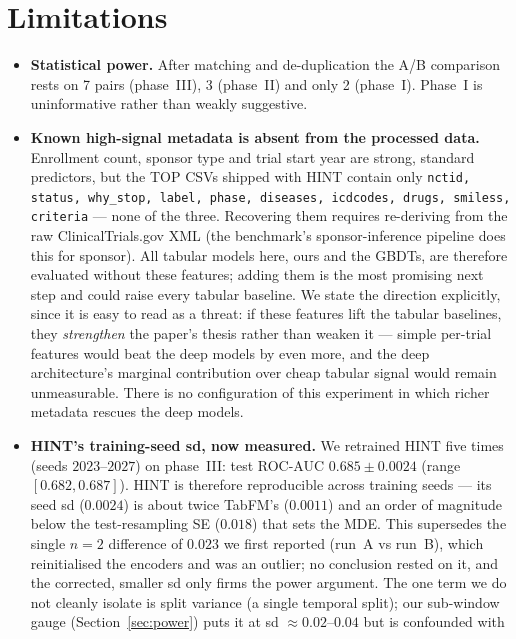 \documentclass[a4paper,fleqn]{cas-sc}
\begin{document}
\section{Limitations}
\begin{itemize}\itemsep2pt
  \item \textbf{Statistical power.} After matching and de-duplication the A/B comparison
        rests on 7 pairs (phase~III), 3 (phase~II) and only 2 (phase~I). Phase~I is
        uninformative rather than weakly suggestive.
  \item \textbf{Known high-signal metadata is absent from the processed data.} Enrollment
        count, sponsor type and trial start year are strong, standard predictors, but the TOP
        CSVs shipped with HINT contain only \texttt{nctid, status, why\_stop, label, phase,
        diseases, icdcodes, drugs, smiless, criteria} --- none of the three. Recovering them
        requires re-deriving from the raw ClinicalTrials.gov XML (the benchmark's
        sponsor-inference pipeline does this for sponsor). All tabular models here, ours and
        the GBDTs, are therefore evaluated without these features; adding them is the most
        promising next step and could raise every tabular baseline. We state the direction
        explicitly, since it is easy to read as a threat: if these features lift the tabular
        baselines, they \emph{strengthen} the paper's thesis rather than weaken it --- simple
        per-trial features would beat the deep models by even more, and the deep architecture's
        marginal contribution over cheap tabular signal would remain unmeasurable. There is no
        configuration of this experiment in which richer metadata rescues the deep models.
  \item \textbf{HINT's training-seed sd, now measured.} We retrained HINT five times (seeds
        $2023$--$2027$) on phase~III: test ROC-AUC $0.685\pm0.0024$ (range $[0.682,0.687]$). HINT
        is therefore reproducible across training seeds --- its seed sd ($0.0024$) is about twice
        TabFM's ($0.0011$) and an order of magnitude below the test-resampling SE ($0.018$) that
        sets the MDE. This supersedes the single $n{=}2$ difference of $0.023$ we first reported
        (run~A vs run~B), which reinitialised the encoders and was an outlier; no conclusion
        rested on it, and the corrected, smaller sd only firms the power argument. The one term we
        do not cleanly isolate is split variance (a single temporal split); our sub-window gauge
        (Section~\ref{sec:power}) puts it at sd $\approx0.02$--$0.04$ but is confounded with

\end{itemize}
\end{document}

